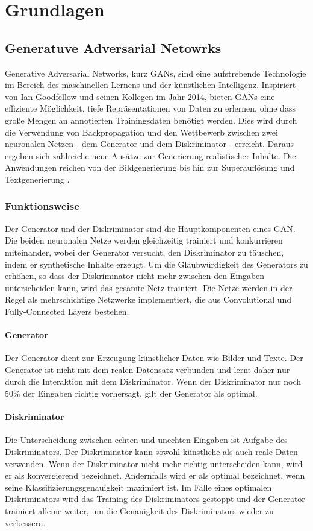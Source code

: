 \chapter{Grundlagen}

\section{Generatuve Adversarial Netowrks}
Generative Adversarial Networks, kurz GANs, sind eine aufstrebende Technologie im Bereich des maschinellen Lernens und der künstlichen Intelligenz. Inspiriert von Ian Goodfellow und seinen Kollegen im Jahr 2014, bieten GANs eine effiziente Möglichkeit, tiefe Repräsentationen von Daten zu erlernen, ohne dass große Mengen an annotierten Trainingsdaten benötigt werden\cite{Creswell.2018}. 
Dies wird durch die Verwendung von Backpropagation und den Wettbewerb zwischen zwei neuronalen Netzen - dem Generator und dem Diskriminator - erreicht. 
Daraus ergeben sich zahlreiche neue Ansätze zur Generierung realistischer Inhalte. 
Die Anwendungen reichen von der Bildgenerierung bis hin zur Superauflösung und Textgenerierung \cite{Aggarwal.2021}.

\subsection*{Funktionsweise}
Der Generator und der Diskriminator sind die Hauptkomponenten eines GAN. Die beiden neuronalen Netze werden gleichzeitig trainiert und konkurrieren miteinander, wobei der Generator versucht, den Diskriminator zu täuschen, indem er synthetische Inhalte erzeugt. Um die Glaubwürdigkeit des Generators zu erhöhen, so dass der Diskriminator nicht mehr zwischen den Eingaben unterscheiden kann, wird das gesamte Netz trainiert. Die Netze werden in der Regel als mehrschichtige Netzwerke implementiert, die aus Convolutional und Fully-Connected Layers bestehen\cite{Creswell.2018}.

\subsubsection*{Generator}
Der Generator dient zur Erzeugung künstlicher Daten wie Bilder und Texte. 
Der Generator ist nicht mit dem realen Datensatz verbunden und lernt daher nur durch die Interaktion mit dem Diskriminator. Wenn der Diskriminator nur noch 50\% der Eingaben richtig vorhersagt, gilt der Generator als optimal\cite{Creswell.2018}.

\subsubsection*{Diskriminator}
Die Unterscheidung zwischen echten und unechten Eingaben ist Aufgabe des Diskriminators. Der Diskriminator kann sowohl künstliche als auch reale Daten verwenden. 
Wenn der Diskriminator nicht mehr richtig unterscheiden kann, wird er als konvergierend bezeichnet\cite{Aggarwal.2021}. Andernfalls wird er als optimal bezeichnet, wenn seine Klassifizierungsgenauigkeit maximiert ist. Im Falle eines optimalen Diskriminators wird das Training des Diskriminators gestoppt und der Generator trainiert alleine weiter, um die Genauigkeit des Diskriminators wieder zu verbessern\cite{Creswell.2018}.

